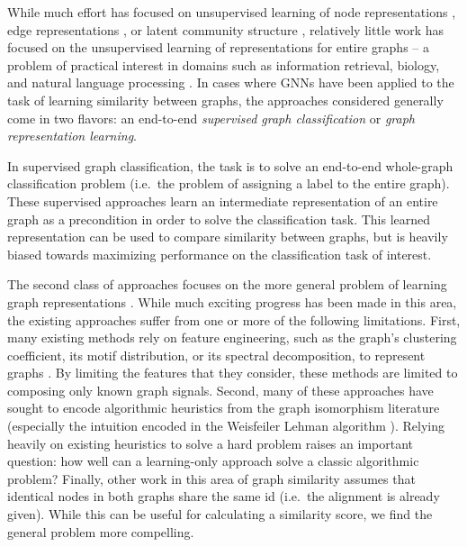 \documentclass[sigconf]{acmart}
\begin{document}
While much effort has focused on unsupervised learning of node representations \cite{deepwalk,node2vec,dngr,tsitsulin2017verse}, edge representations \cite{asymmetric}, or latent community structure \cite{cavallari2017learning,wang2017community,zheng2016node}, relatively little work has focused on the unsupervised learning of representations for entire graphs -- a problem of practical interest in domains such as information retrieval, biology, and natural language processing \cite{gilmer2017neural,battaglia2018relational}.
In cases where GNNs have been applied to the task of learning similarity between graphs, the approaches considered generally come in two flavors: an end-to-end \textit{supervised graph classification} or \textit{graph representation learning}.

In supervised graph classification, the task is to solve an end-to-end whole-graph classification problem (i.e.\ the problem of assigning a label to the entire graph).
These supervised approaches \cite{patchysan,zhang2018end,tixier2018graph,morris2018weisfeiler} learn an intermediate representation of an entire graph as a precondition in order to solve the classification task.
This learned representation can be used to compare similarity between graphs, but is heavily biased towards maximizing performance on the classification task of interest.  

The second class of approaches focuses on the more general problem of learning graph representations \cite{taheri2018RNN}.
While much exciting progress has been made in this area, the existing approaches suffer from one or more of the following limitations.
First, many existing methods rely on feature engineering, such as the graph's clustering coefficient, its motif distribution, or its spectral decomposition, to represent graphs \cite{berlingerio2012netsimile,yanardag2015deep,tsitsulin2018netlsd}.
By limiting the features that they consider, these methods are limited to composing only known graph signals.
Second, many of these approaches \cite{patchysan,zhang2018end} have sought to encode algorithmic heuristics from the graph isomorphism literature (especially the intuition encoded in the Weisfeiler Lehman algorithm \cite{shervashidze2011weisfeiler}).
Relying heavily on existing heuristics to solve a hard problem raises an important question: how well can a learning-only approach solve a classic algorithmic problem?
Finally, other work in this area of graph similarity assumes that identical nodes in both graphs share the same id (i.e.\ the alignment is already given).
While this can be useful for calculating a similarity score, we find the general problem more compelling.
\end{document}

